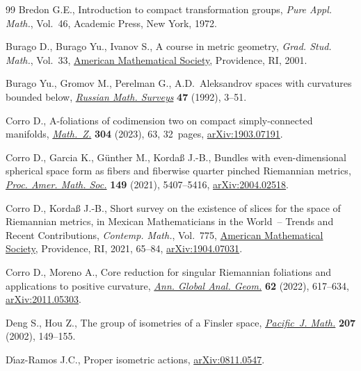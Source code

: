 \documentclass[10pt,a4paper]{amsart}
\numberwithin{equation}{section}
\theoremstyle{definition}
\begin{document}
\begin{thebibliography}{99}
Bredon G.E., Introduction to compact transformation groups, \textit{Pure Appl.
 Math.}, Vol.~46, Academic Press, New York, 1972.

Burago D., Burago Yu., Ivanov S., A course in metric geometry, \textit{Grad.
 Stud. Math.}, Vol.~33, \href{https://doi.org/10.1090/gsm/033}{American
 Mathematical Society}, Providence, RI, 2001.

Burago Yu., Gromov M., Perelman G., A.{D}.~{A}leksandrov spaces with curvatures
 bounded below,
 \href{https://doi.org/10.1070/RM1992v047n02ABEH000877}{\textit{Russian Math.
 Surveys}} \textbf{47} (1992), 3--51.

Corro D., A-foliations of codimension two on compact simply-connected
 manifolds,
 \href{https://doi.org/10.1007/s00209-023-03317-3}{\textit{Math.~Z.}}
 \textbf{304} (2023), 63, 32~pages,
 \href{http://arxiv.org/abs/1903.07191}{arXiv:1903.07191}.

Corro D., Garcia K., G\"unther M., Korda{\ss} J.-B., Bundles with even-dimensional
 spherical space form as fibers and fiberwise quarter pinched {R}iemannian
 metrics, \href{https://doi.org/10.1090/proc/15649}{\textit{Proc. Amer. Math.
 Soc.}} \textbf{149} (2021), 5407--5416,
 \href{http://arxiv.org/abs/2004.02518}{arXiv:2004.02518}.

Corro D., Korda{\ss} J.-B., Short survey on the existence of slices for the
 space of {R}iemannian metrics, in Mexican {M}athematicians in the {W}orld~--
 {T}rends and {R}ecent {C}ontributions, \textit{Contemp. Math.}, Vol.~775,
 \href{https://doi.org/10.1090/conm/775/15589}{American Mathematical Society}, Providence, RI, 2021, 65--84, \href{http://arxiv.org/abs/1904.07031}{arXiv:1904.07031}.

Corro D., Moreno A., Core reduction for singular {R}iemannian foliations and
 applications to positive curvature,
 \href{https://doi.org/10.1007/s10455-022-09856-y}{\textit{Ann. Global Anal.
 Geom.}} \textbf{62} (2022), 617--634,
 \href{http://arxiv.org/abs/2011.05303}{arXiv:2011.05303}.

Deng S., Hou Z., The group of isometries of a {F}insler space,
 \href{https://doi.org/10.2140/pjm.2002.207.149}{\textit{Pacific~J. Math.}}
 \textbf{207} (2002), 149--155.

D\'{\i}az-Ramos J.C., Proper isometric actions,
 \href{http://arxiv.org/abs/0811.0547}{arXiv:0811.0547}.


\end{thebibliography}
\end{document}
